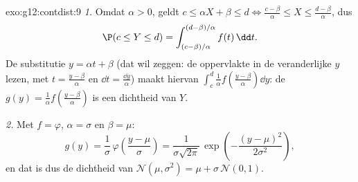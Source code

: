 \begin{solution}{exo:g12:contdist:9}
\emph{1.} Omdat $\alpha > 0$, geldt $c \leq \alpha X + \beta \leq d
\iff \frac{c - \beta}{\alpha} \leq X \leq \frac{d - \beta}{\alpha}$, dus
\[
\P(c \leq Y \leq d)
= \int_{(c-\beta)/\alpha}^{(d-\beta)/\alpha} f(t)\,\dd t .
\]
De substitutie $y = \alpha t + \beta$ (dat wil zeggen: de oppervlakte in de
veranderlijke $y$ lezen, met $t = \frac{y - \beta}{\alpha}$ en
$\dd t = \frac{\dd y}{\alpha}$) maakt hiervan
$\int_c^d \frac{1}{\alpha} f\left(\frac{y-\beta}{\alpha}\right)\dd y$: de
 $g(y) = \frac1\alpha f\left(\frac{y-\beta}{\alpha}\right)$ is een
dichtheid van $Y$.

\emph{2.} Met $f = \varphi$, $\alpha = \sigma$ en $\beta = \mu$:
\[
g(y) = \frac{1}{\sigma}\,\varphi\!\left(\frac{y - \mu}{\sigma}\right)
= \frac{1}{\sigma\sqrt{2\pi}}\,
\exp\left(-\frac{(y-\mu)^2}{2\sigma^2}\right),
\]
en dat is dus de dichtheid van
$\mathcal N(\mu, \sigma^2) = \mu + \sigma\,\mathcal N(0,1)$.
\end{solution}

